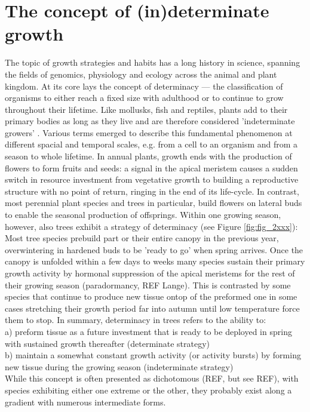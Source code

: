 \documentclass{article}
\begin{document}
	
\section*{The concept of (in)determinate growth}
The topic of growth strategies and habits has a long history in science, spanning the fields of genomics, physiology and ecology across the animal and plant kingdom. At its core lays the concept of determinacy --- the classification of organisms to either reach a fixed size with adulthood or to continue to grow throughout their lifetime. Like mollusks, fish and reptiles, plants add to their primary bodies as long as they live and are therefore considered 'indeterminate growers' \citep{ejsmondHowTimeGrowth2010}. Various terms emerged to describe this fundamental phenomenon at different spacial and temporal scales, e.g. from a cell to an organism and from a season to whole lifetime. In annual plants, growth ends with the production of flowers to form fruits and seeds: a signal in the apical meristem causes a sudden switch in resource investment from vegetative growth to building a reproductive structure with no point of return, ringing in the end of its life-cycle. In contrast, most perennial plant species and trees in particular, build flowers on lateral buds to enable the seasonal production of offsprings. Within one growing season, however, also trees exhibit a strategy of determinacy (see Figure \ref{fig:fig_2xxx}): Most tree species prebuild part or their entire canopy in the previous year, overwintering in hardened buds to be 'ready to go' when spring arrives. Once the canopy is unfolded within a few days to weeks many species sustain their primary growth activity by hormonal suppression of the apical meristems for the rest of their growing season (paradormancy, REF Lange). This is contrasted by some species that continue to produce new tissue ontop of the preformed one in some cases stretching their growth period far into autumn until low temperature force them to stop. In summary, determinacy in trees refers to the ability to:\\
a) preform tissue as a future investment that is ready to be deployed in spring with sustained growth thereafter (determinate strategy)\\
b) maintain a somewhat constant growth activity (or activity bursts) by forming new tissue during the growing season (indeterminate strategy)\\

While this concept is often presented as dichotomous (REF, but see REF), with species exhibiting either one extreme or the other, they probably exist along a gradient with numerous intermediate forms.
	
\end{document}
